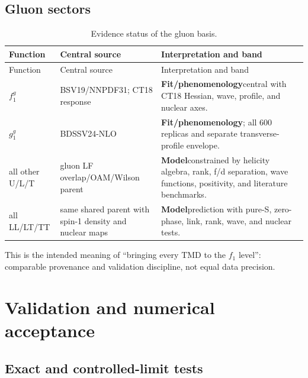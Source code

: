 \documentclass[11pt]{article}
\newcommand{\status}[1]{\textsf{\textbf{#1}}}
\newcommand{\fit}{\status{Fit/phenomenology}}
\newcommand{\model}{\status{Model}}
\begin{document}
\subsection{Gluon sectors}

\begin{longtable}{L{0.22\textwidth}L{0.30\textwidth}L{0.39\textwidth}}
\caption{Evidence status of the gluon basis.}
\label{tab:gluon-evidence}\\
\toprule
Function & Central source & Interpretation and band \\
\midrule
\endfirsthead
\toprule
Function & Central source & Interpretation and band \\
\midrule
\endhead
\(f_1^g\) & BSV19/NNPDF31; CT18 response &
\fit central with CT18 Hessian, wave, profile, and nuclear axes.\\
\(g_1^g\) & BDSSV24-NLO &
\fit; all 600 replicas and separate transverse-profile envelope.\\
all other U/L/T &
gluon LF overlap/OAM/Wilson parent &
\model constrained by helicity algebra, rank, f/d separation,
wave functions, positivity, and literature benchmarks.\\
all LL/LT/TT &
same shared parent with spin-1 density and nuclear maps &
\model prediction with pure-S, zero-phase, link, rank, wave, and nuclear
tests.\\
\bottomrule
\end{longtable}

This is the intended meaning of ``bringing every TMD to the \(f_1\)
level'': comparable provenance and validation discipline, not equal data
precision.

\section{Validation and numerical acceptance}
\label{sec:validation}

\subsection{Exact and controlled-limit tests}
\end{document}
